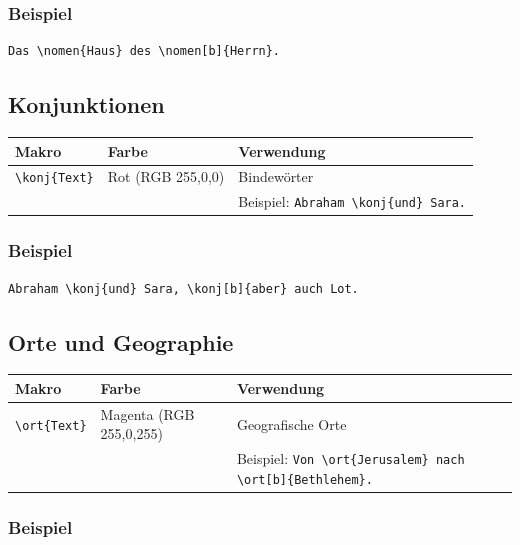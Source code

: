 \documentclass[12pt,a4paper]{scrartcl}
\begin{document}
\subsubsection{Beispiel}

\begin{lstlisting}
Das \nomen{Haus} des \nomen[b]{Herrn}.
\end{lstlisting}

\subsection{Konjunktionen}

\begin{longtable}{llp{8cm}}
\toprule
\textbf{Makro} & \textbf{Farbe} & \textbf{Verwendung} \\
\midrule
\endhead
%
\lstinline|\konj{Text}| & Rot (RGB 255,0,0) & Bindewörter \\
& & Beispiel: \lstinline|Abraham \konj{und} Sara.| \\
\bottomrule
\end{longtable}

\subsubsection{Beispiel}

\begin{lstlisting}
Abraham \konj{und} Sara, \konj[b]{aber} auch Lot.
\end{lstlisting}

\subsection{Orte und Geographie}

\begin{longtable}{llp{8cm}}
\toprule
\textbf{Makro} & \textbf{Farbe} & \textbf{Verwendung} \\
\midrule
\endhead
%
\lstinline|\ort{Text}| & Magenta (RGB 255,0,255) & Geografische Orte \\
& & Beispiel: \lstinline|Von \ort{Jerusalem} nach \ort[b]{Bethlehem}.| \\
\bottomrule
\end{longtable}

\subsubsection{Beispiel}
\end{document}
